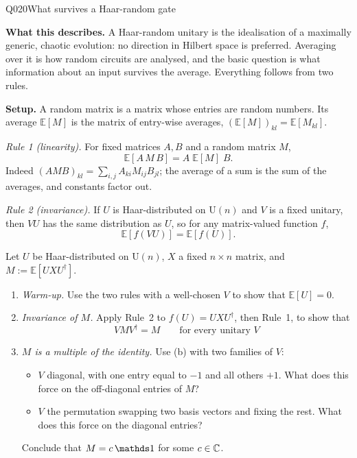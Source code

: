 \begin{entry}{Q020}{What survives a Haar-random gate}


\begin{problem}
\textbf{What this describes.} A Haar-random unitary is the idealisation of a maximally
generic, chaotic evolution: no direction in Hilbert space is preferred. Averaging over it
is how random circuits are analysed, and the basic question is what information about an
input survives the average. Everything follows from two rules.

\textbf{Setup.} A random matrix is a matrix whose entries are random numbers. Its average
$\mathbb E[M]$ is the matrix of entry-wise averages, $(\mathbb E[M])_{kl}=\mathbb E[M_{kl}]$.

\emph{Rule 1 (linearity).} For fixed matrices $A,B$ and a random matrix $M$,
\[
  \mathbb E[A\,M\,B]=A\;\mathbb E[M]\;B .
\]
Indeed $(AMB)_{kl}=\sum_{i,j}A_{ki}M_{ij}B_{jl}$; the average of a sum is the sum of the
averages, and constants factor out.

\emph{Rule 2 (invariance).} If $U$ is Haar-distributed on $\mathrm U(n)$ and $V$ is a
fixed unitary, then $VU$ has the same distribution as $U$, so for any matrix-valued
function $f$,
\[
  \mathbb E[f(VU)]=\mathbb E[f(U)] .
\]

Let $U$ be Haar-distributed on $\mathrm U(n)$, $X$ a fixed $n\times n$ matrix, and
$M:=\mathbb E[UXU^{\dagger}]$.

\begin{enumerate}[label=\textbf{(\alph*)},leftmargin=*]
  \item \emph{Warm-up.} Use the two rules with a well-chosen $V$ to show that
        $\mathbb E[U]=0$.

  \item \emph{Invariance of $M$.} Apply Rule~2 to $f(U)=UXU^{\dagger}$, then Rule~1,
        to show that
        \begin{equation}
            VMV^{\dagger}=M\qquad\text{for every unitary } V 
            \label{invariance identity}
        \end{equation}
          

  \item \emph{$M$ is a multiple of the identity.} Use (b) with two families of $V$:
        \begin{itemize}
          \item $V$ diagonal, with one entry equal to $-1$ and all others $+1$. What does
                this force on the off-diagonal entries of $M$?
          \item $V$ the permutation swapping two basis vectors and fixing the rest. What
                does this force on the diagonal entries?
        \end{itemize}
        Conclude that $M=c\,\id$ for some $c\in\mathbb{C}$.


\end{enumerate}
\end{problem}
\end{entry}
